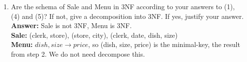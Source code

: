 \documentclass[paper=a4, fontsize=11pt]{scrartcl}
\numberwithin{equation}{section}		%
\numberwithin{figure}{section}			%
\numberwithin{table}{section}				%
\begin{document}
\begin{enumerate}
\item Are the schema of Sale and Menu in 3NF according to your answers to (1), (4) and (5)? If not, give a decomposition into 3NF. If yes, justify your answer.\\
\textbf{Answer: }Sale is not 3NF, Menu is 3NF.\\
\textbf{Sale: }(clerk, store), (store, city), (clerk, date, dish, size)\\
\textbf{Menu: }$dish, size \rightarrow price$, so (dish, size, price) is the minimal-key, the result from step 2. We do not need decompose this.

\end{enumerate}




\end{document}
